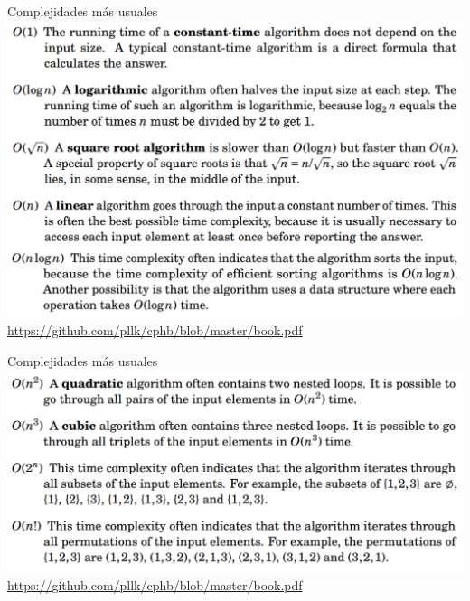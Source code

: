\documentclass[12pt]{beamer}
\begin{document}
\begin{frame}{Complejidades más usuales}
    \includegraphics[width=\textwidth]{complejidades1.png}
    \centering\url{https://github.com/pllk/cphb/blob/master/book.pdf}
\end{frame}

\begin{frame}{Complejidades más usuales}
    \includegraphics[width=\textwidth]{complejidades2.png}
    \centering\url{https://github.com/pllk/cphb/blob/master/book.pdf}
\end{frame}
\end{document}
